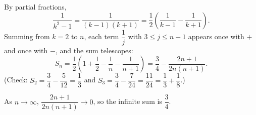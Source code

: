 By partial fractions,
\[\dfrac{1}{k^2-1}=\dfrac{1}{(k-1)(k+1)}=\dfrac12\left(\dfrac1{k-1}-\dfrac1{k+1}\right).\]
Summing from $k=2$ to $n$, each term $\dfrac1j$ with $3\le j\le n-1$ appears once with $+$ and once with $-$, and the sum telescopes:
\[S_n=\dfrac12\left(1+\dfrac12-\dfrac1n-\dfrac1{n+1}\right)=\boxed{\dfrac34-\dfrac{2n+1}{2n(n+1)}}.\]
(Check: $S_2=\dfrac34-\dfrac5{12}=\dfrac13$ and $S_3=\dfrac34-\dfrac7{24}=\dfrac{11}{24}=\dfrac13+\dfrac18$.)

As $n\to\infty$, $\dfrac{2n+1}{2n(n+1)}\to0$, so the infinite sum is $\boxed{\dfrac34}$.
